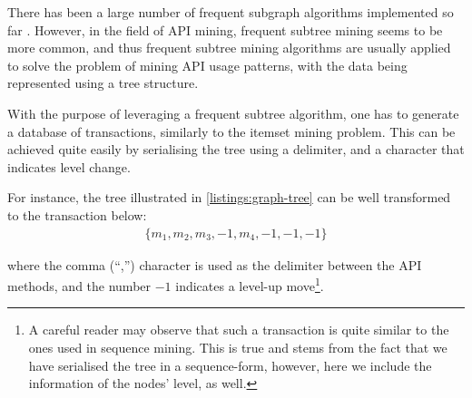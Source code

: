 There has been a large number of frequent subgraph algorithms implemented so far \cite{Yan:2002, Huan:2004}. However, in the field of API mining, frequent subtree mining seems to be more common, and thus frequent subtree mining algorithms are usually applied to solve the problem of mining API usage patterns, with the data being represented using a tree structure.

With the purpose of leveraging a frequent subtree algorithm, one has to generate a database of transactions, similarly to the itemset mining problem. This can be achieved quite easily by serialising the tree using a delimiter, and a character that indicates level change. 

For instance, the tree illustrated in \ref{listings:graph-tree} can be well transformed to the transaction below:
\begin{align*}
\{m_1,m_2,m_3,-1,m_4,-1,-1,-1\}
\end{align*}

\noindent
where the comma (``,'') character is used as the delimiter between the API methods, and the number $-1$ indicates a level-up move\footnote{A careful reader may observe that such a transaction is quite similar to the ones used in sequence mining. This is true and stems from the fact that we have serialised the tree in a sequence-form, however, here we include the information of the nodes' level, as well.}.

